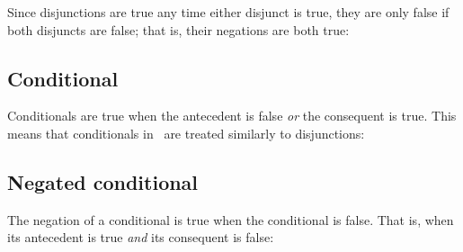\documentclass[PHIL101-Textbook.tex]{subfiles}
\begin{document}
Since disjunctions are true any time either disjunct is true, they are only false if both disjuncts are false; that is, their negations are both true:



\subsection{Conditional}

Conditionals are true when the antecedent is false \emph{or} the consequent is true. This means that conditionals in \tfl\ are treated similarly to disjunctions:

%


\subsection{Negated conditional}

The negation of a conditional is true when the conditional is false. That is, when its antecedent is true \emph{and} its consequent is false:

\end{document}
